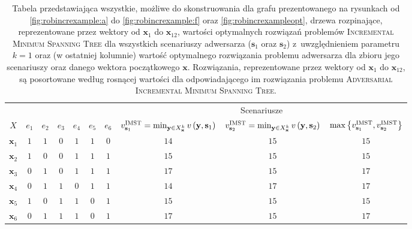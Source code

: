 \begin{table}[!htbp]
	\caption{
		Tabela przedstawiająca wszystkie, możliwe do skonstruowania dla grafu prezentowanego na rysunkach od \ref{fig:robincrexample:a} do \ref{fig:robincrexample:f} oraz \ref{fig:robincrexampleopt}, drzewa rozpinające, reprezentowane przez wektory od $\textbf{x}_{1}$ do $\textbf{x}_{12}$, wartości optymalnych rozwiązań problemów \textsc{Incremental Minimum Spanning Tree} dla wszystkich scenariuszy adwersarza ($\textbf{s}_{1}$ oraz $\textbf{s}_{2}$) z~uwzględnieniem parametru $k = 1$ oraz (w ostatniej kolumnie) wartość optymalnego rozwiązania problemu adwersarza dla zbioru jego scenariuszy oraz danego wektora początkowego $\textbf{x}$.
		Rozwiązania, reprezentowane przez wektory od $\textbf{x}_{1}$ do $\textbf{x}_{12}$, są posortowane według rosnącej wartości dla odpowiadającego im rozwiązania problemu \textsc{Adversarial Incremental Minimum Spanning Tree}.
	}
	\label{tab:minmaxrobexample}
	\begin{tabular}{cccccccccc}
		\cline{8-10}
		\multicolumn{2}{l}{}       &         &         &         &         &         & \multicolumn{3}{c}{Scenariusze}                                                                                                                                                                                              \\
		$X$              & $e_{1}$ & $e_{2}$ & $e_{3}$ & $e_{4}$ & $e_{5}$ & $e_{6}$ & 	\footnotesize$v^{\textsc{IMST}}_{\textbf{s}_{1}} = \min_{\textbf{y} \in X^{k}_{\textbf{x}}} v \left( \textbf{y}, \textbf{s}_{1} \right) $ &\footnotesize $v^{\textsc{IMST}}_{\textbf{s}_{2}} = \min_{\textbf{y} \in X^{k}_{\textbf{x}}} v \left( \textbf{y}, \textbf{s}_{2} \right)$ &\footnotesize $\max \left\{ v^{\textsc{IMST}}_{\textbf{s}_{1}}, v^{\textsc{IMST}}_{\textbf{s}_{2}} \right\} $ \\\normalsize
		$\textbf{x}_{1}$	&	$1$	&	$1$	&	$0$	&	$1$	&	$1$	&	$0$	&	$14$	&	$15$	&	$15$	\\
		$\textbf{x}_{2}$	&	$1$	&	$0$	&	$0$	&	$1$	&	$1$	&	$1$	&	$15$	&	$15$	&	$15$	\\
		$\textbf{x}_{3}$	&	$0$	&	$1$	&	$0$	&	$1$	&	$1$	&	$1$	&	$17$	&	$15$	&	$17$	\\
		$\textbf{x}_{4}$	&	$0$	&	$1$	&	$1$	&	$0$	&	$1$	&	$1$	&	$14$	&	$17$	&	$17$	\\
		$\textbf{x}_{5}$	&	$1$	&	$0$	&	$1$	&	$1$	&	$0$	&	$1$	&	$15$	&	$15$	&	$15$	\\
		$\textbf{x}_{6}$	&	$0$	&	$1$	&	$1$	&	$1$	&	$0$	&	$1$	&	$17$	&	$15$	&	$17$	\\

\end{tabular}
\end{table}
